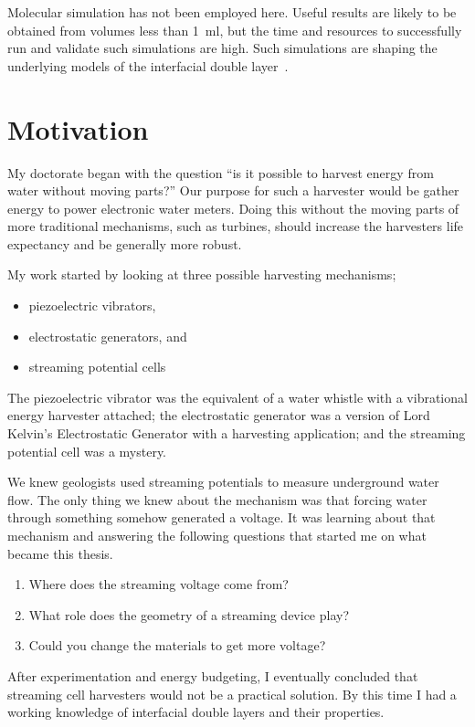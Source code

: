     Molecular simulation has not been employed here.
    Useful results are likely to be obtained from volumes less than \SI{1}{\milli\litre}, but the time and resources to successfully run and validate such simulations are high.
    Such simulations are shaping the underlying models of the interfacial double layer~\cite{Kornyshev2007}.


\section{Motivation}
  My doctorate began with the question ``is it possible to harvest energy from water without moving parts?''
  Our purpose for such a harvester would be gather energy to power electronic water meters.
  Doing this without the moving parts of more traditional mechanisms, such as turbines, should increase the harvesters life expectancy and be generally more robust.

  My work started by looking at three possible harvesting mechanisms;
  \begin{itemize}
    \item piezoelectric vibrators,
    \item electrostatic generators, and
    \item streaming potential cells
  \end{itemize}

  The piezoelectric vibrator was the equivalent of a water whistle with a vibrational energy harvester attached; the electrostatic generator was a version of Lord Kelvin's Electrostatic Generator with a harvesting application; and the streaming potential cell was a mystery.

  We knew geologists used streaming potentials to measure underground water flow.
  The only thing we knew about the mechanism was that forcing water through something somehow generated a voltage.
  It was learning about that mechanism and answering the following questions that started me on what became this thesis.
  \begin{enumerate}
    \item Where does the streaming voltage come from?
    \item What role does the geometry of a streaming device play?
    \item Could you change the materials to get more voltage?
  \end{enumerate}
  After experimentation and energy budgeting, I eventually concluded that streaming cell harvesters would not be a practical solution.
  By this time I had a working knowledge of interfacial double layers and their properties.

